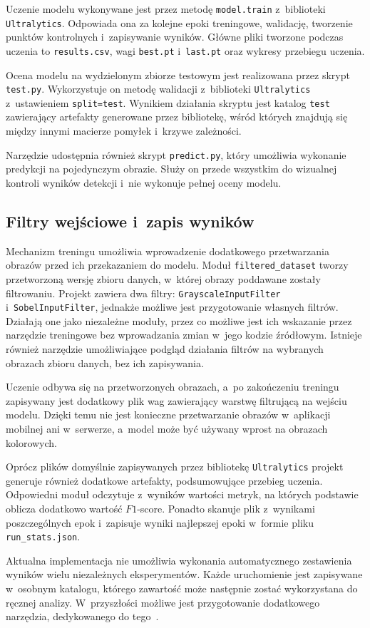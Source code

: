 Uczenie modelu wykonywane jest przez metodę \texttt{model.train} z~biblioteki \texttt{Ultralytics}. Odpowiada ona za kolejne epoki treningowe, walidację, tworzenie punktów kontrolnych i~zapisywanie wyników. Główne pliki tworzone podczas uczenia to \texttt{results.csv}, wagi \texttt{best.pt} i~\texttt{last.pt} oraz wykresy przebiegu uczenia.

Ocena modelu na wydzielonym zbiorze testowym jest realizowana przez skrypt \texttt{test.py}. Wykorzystuje on metodę walidacji z~biblioteki \texttt{Ultralytics} z~ustawieniem \texttt{split=test}. Wynikiem działania skryptu jest katalog \texttt{test} zawierający artefakty generowane przez bibliotekę, wśród których znajdują się między innymi macierze pomyłek i~krzywe zależności.

Narzędzie udostępnia również skrypt \texttt{predict.py}, który umożliwia wykonanie predykcji na pojedynczym obrazie. Służy on przede wszystkim do wizualnej kontroli wyników detekcji i~nie wykonuje pełnej oceny modelu.

\subsection{Filtry wejściowe i~zapis wyników}
\label{ssec:filtry}

Mechanizm treningu umożliwia wprowadzenie dodatkowego przetwarzania obrazów przed ich przekazaniem do modelu. Moduł \texttt{filtered\_dataset} tworzy przetworzoną wersję zbioru danych, w~której obrazy poddawane zostały filtrowaniu. Projekt zawiera dwa filtry: \texttt{GrayscaleInputFilter} i~\texttt{SobelInputFilter}, jednakże możliwe jest przygotowanie własnych filtrów. Działają one jako niezależne moduły, przez co możliwe jest ich wskazanie przez narzędzie treningowe bez wprowadzania zmian w~jego kodzie źródłowym. Istnieje również narzędzie umożliwiające podgląd działania filtrów na wybranych obrazach zbioru danych, bez ich zapisywania.

Uczenie odbywa się na przetworzonych obrazach, a~po zakończeniu treningu zapisywany jest dodatkowy plik wag zawierający warstwę filtrującą na wejściu modelu. Dzięki temu nie jest konieczne przetwarzanie obrazów w~aplikacji mobilnej ani w~serwerze, a~model może być używany wprost na obrazach kolorowych.

Oprócz plików domyślnie zapisywanych przez bibliotekę \texttt{Ultralytics} projekt generuje również dodatkowe artefakty, podsumowujące przebieg uczenia. Odpowiedni moduł odczytuje z~wyników wartości metryk, na których podstawie oblicza dodatkowo wartość $F1$-score. Ponadto skanuje plik z~wynikami poszczególnych epok i~zapisuje wyniki najlepszej epoki w~formie pliku \texttt{run\_stats.json}.

Aktualna implementacja nie umożliwia wykonania automatycznego zestawienia wyników wielu niezależnych eksperymentów. Każde uruchomienie jest zapisywane w~osobnym katalogu, którego zawartość może następnie zostać wykorzystana do ręcznej analizy. W~przyszłości możliwe jest przygotowanie dodatkowego narzędzia, dedykowanego do tego~.
